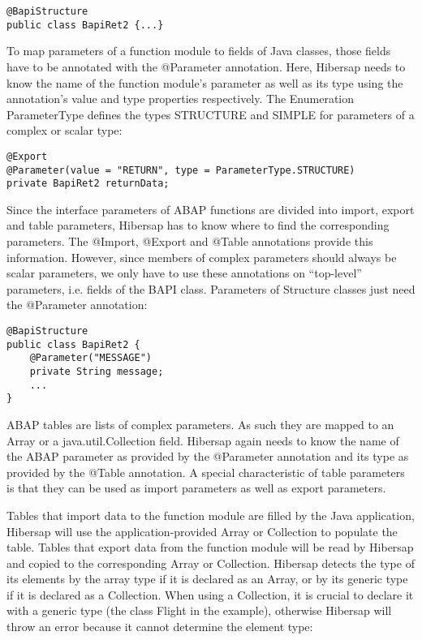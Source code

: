 \begin{lstlisting}
@BapiStructure 
public class BapiRet2 {...}
\end{lstlisting}

To map parameters of a function module to fields of Java classes, those fields have to be annotated with the @Parameter annotation. Here, Hibersap needs to know the name of the function module's parameter as well as its type using the annotation's value and type properties respectively. The Enumeration ParameterType defines the types STRUCTURE and SIMPLE for parameters of a complex or scalar type:

\begin{lstlisting}
@Export 
@Parameter(value = "RETURN", type = ParameterType.STRUCTURE) 
private BapiRet2 returnData;
\end{lstlisting}

Since the interface parameters of ABAP functions are divided into import, export and table parameters, Hibersap has to know where to find the corresponding parameters. The @Import, @Export and @Table annotations provide this information. However, since members of complex parameters should always be scalar parameters, we only have to use these annotations on ``top-level'' parameters, i.e. fields of the BAPI class. Parameters of Structure classes just need the @Parameter annotation:

\begin{lstlisting}
@BapiStructure 
public class BapiRet2 {
    @Parameter("MESSAGE") 
    private String message; 
    ...
}
\end{lstlisting}

ABAP tables are lists of complex parameters. As such they are mapped to an Array or a java.util.Collection field. Hibersap again needs to know the name of the ABAP parameter as provided by the @Parameter annotation and its type as provided by the @Table annotation. A special characteristic of table parameters is that they can be used as import parameters as well as export parameters. 

Tables that import data to the function module are filled by the Java application, Hibersap will use the application-provided Array or Collection to populate the table. Tables that export data from the function module will be read by Hibersap and copied to the corresponding Array or Collection. Hibersap detects the type of its elements by the array type if it is declared as an Array, or by its generic type if it is declared as a Collection. When using a Collection, it is crucial to declare it with a generic type (the class Flight in the example), otherwise Hibersap will throw an error because it cannot determine the element type: 

